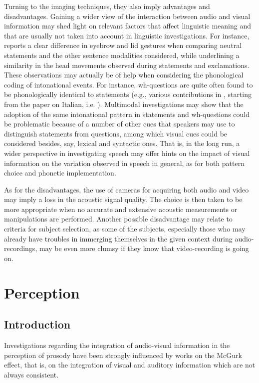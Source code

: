 \documentclass[output=paper]{langsci/langscibook}
\begin{document}
Turning to the imaging techniques, they also imply advantages and disadvantages. Gaining a wider view of the interaction between audio and visual information may shed light on relevant factors that affect linguistic meaning and that are usually not taken into account in linguistic investigations. For instance, \citet{GiliFivela2015informazionimultimodali} reports a clear difference in eyebrow and lid gestures when comparing neutral statements and the other sentence modalities considered, while underlining a similarity in the head movements observed during statements and exclamations. These observations may actually be of help when considering the phonological coding of intonational events. For instance, wh-questions are quite often found to be phonologically identical to statements (e.g., various contributions in \citealt{frotaPrieto2015}, starting from the paper on Italian, i.e. \citealt{GiliFivelaETAL2015intonationalvariation}). Multimodal investigations may show that the adoption of the same intonational pattern in statements and wh-questions could be problematic because of a number of other cues that speakers may use to distinguish statements from questions, among which visual cues could be considered besides, say, lexical and syntactic ones. That is, in the long run, a wider perspective in investigating speech may offer hints on the impact of visual information on the variation observed in speech in general, as for both pattern choice and phonetic implementation.

As for the disadvantages,  the use of cameras for acquiring both audio and video may imply a loss in the acoustic signal quality. The choice is then taken to be more appropriate when no accurate and extensive acoustic measurements or manipulations are performed. Another possible disadvantage may relate to criteria for subject selection, as some of the subjects, especially those who may already have troubles in immerging themselves in the given context during audio-recordings, may be even more clumsy if they know that video-recording is going on. 

\section{Perception} \label{sec:gil:3}
\subsection{Introduction} \label{sec:gil:3:1}
Investigations regarding the integration of audio-visual information in the perception of prosody have been strongly influenced by works on the McGurk effect, that is, on the integration of visual and auditory information which are not always consistent. 
\end{document}
